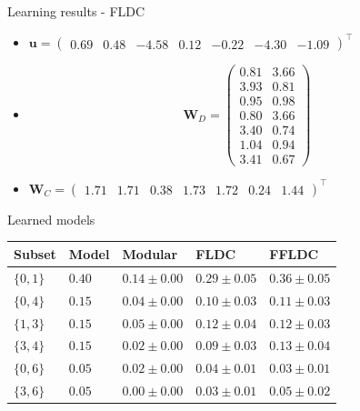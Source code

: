 \documentclass{beamer}
\begin{document}
\begin{frame}{Learning results - FLDC}
  \begin{itemize}
    \item $\mathbf{u} = \left( \begin{array}{ccccccc} 0.69 & 0.48 & -4.58 & 0.12 & -0.22 & -4.30 & -1.09 \end{array}\right)^{\intercal}$
    \item \begin{equation*}
      \mathbf{W}_{D} = \left( \begin{array}{cc}
      0.81 & 3.66 \\
      3.93 & 0.81 \\
      0.95 & 0.98 \\
      0.80 & 3.66 \\
      3.40 & 0.74 \\
      1.04 & 0.94 \\
      3.41 & 0.67 \end{array} \right)
    \end{equation*}
    \item $\mathbf{W}_{C} = \left( \begin{array}{ccccccc} 1.71 & 1.71 & 0.38 & 1.73 & 1.72 & 0.24 & 1.44 \end{array}\right)^{\intercal}$
  \end{itemize}
\end{frame}

\begin{frame}{Learned models}
  \begin{table}
    \centering
    \begin{tabular}{@{}lllll@{}}
      \hline
      \textbf{Subset} & \textbf{Model} & \textbf{Modular} & \textbf{FLDC} & \textbf{FFLDC} \\
      \hline
      $\{0,1\}$ & $0.40$ & $0.14 \pm 0.00$ & $0.29 \pm 0.05$ & $0.36 \pm 0.05$  \\
      $\{0,4\}$ & $0.15$ & $0.04 \pm 0.00$ & $0.10 \pm 0.03$ & $0.11 \pm 0.03$ \\
      $\{1,3\}$ & $0.15$ & $0.05 \pm 0.00$ & $0.12 \pm 0.04$ & $0.12 \pm 0.03$ \\
      $\{3,4\}$ & $0.15$ & $0.02 \pm 0.00$ & $0.09 \pm 0.03$ & $0.13 \pm 0.04$ \\
      $\{0,6\}$ & $0.05$ & $0.02 \pm 0.00$ & $0.04 \pm 0.01$ & $0.03 \pm 0.01$ \\
      $\{3,6\}$ & $0.05$ & $0.00 \pm 0.00$ & $0.03 \pm 0.01$ & $0.05 \pm 0.02$ \\
      \hline
    \end{tabular}
  \end{table}
\end{frame}
\end{document}
